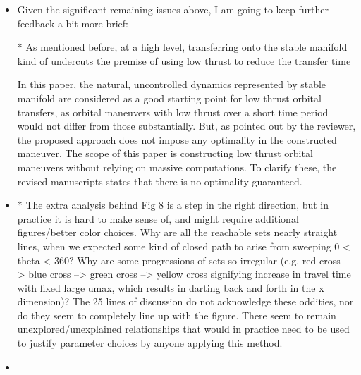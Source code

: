 \documentclass[11pt]{article}
\begin{document}
\begin{itemize}
    \item
        \begin{itshape}

            Given the significant remaining issues above, I am going to keep further
            feedback a bit more brief:

            * As mentioned before, at a high level, transferring onto the stable
            manifold kind of undercuts the premise of using low thrust to reduce the
            transfer time
        \end{itshape}

        In this paper, the natural, uncontrolled dynamics represented by stable manifold are considered as a good starting point for low thrust orbital transfers, as orbital maneuvers with low thrust over a short time period would not differ from those substantially. 
        But, as pointed out by the reviewer, the proposed approach does not impose any optimality in the constructed maneuver. 
        The scope of this paper is constructing low thrust orbital maneuvers without relying on massive computations. 
        To clarify these, the revised manuscripts states that there is no optimality guaranteed.

    \item
        \begin{itshape}

            * The extra analysis behind Fig 8 is a step in the right direction, but in
            practice it is hard to make sense of, and might require additional
            figures/better color choices.  Why are all the reachable sets nearly
            straight lines, when we expected some kind of closed path to arise from
            sweeping 0 < theta < 360?  Why are some progressions of sets so irregular
            (e.g. red cross --> blue cross --> green cross --> yellow cross signifying
            increase in travel time with fixed large umax, which results in darting
            back and forth in the x dimension)?  The 25 lines of discussion do not
            acknowledge these oddities, nor do they seem to completely line up with the
            figure.  There seem to remain unexplored/unexplained relationships that
            would in practice need to be used to justify parameter choices by anyone
            applying this method.   
        \end{itshape}

    \item
        \begin{itshape}


\end{itshape}
\end{itemize}
\end{document}
